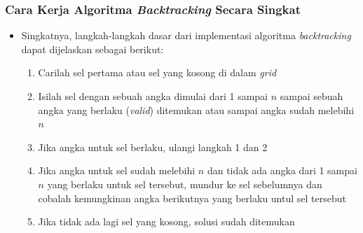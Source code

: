 \documentclass{beamer}
\begin{document}
\begin{frame}
\frametitle{Cara Kerja Algoritma \protect\textit{Backtracking} Secara Singkat}
\begin{itemize}
\item Singkatnya, langkah-langkah dasar dari implementasi algoritma \textit{backtracking} dapat dijelaskan sebagai berikut:
\begin{enumerate}
	\item Carilah sel pertama atau sel yang kosong di dalam \textit{grid}
	\item Isilah sel dengan sebuah angka dimulai dari 1 sampai \begin{math}n\end{math} sampai sebuah angka yang berlaku (\textit{valid}) ditemukan atau sampai angka sudah melebihi \begin{math}n\end{math}
	\item Jika angka untuk sel berlaku, ulangi langkah 1 dan 2
	\item Jika angka untuk sel sudah melebihi \begin{math}n\end{math} dan tidak ada angka dari 1 sampai \begin{math}n\end{math} yang berlaku untuk sel tersebut, mundur ke sel sebelumnya dan cobalah kemungkinan angka berikutnya yang berlaku untul sel tersebut
	\item Jika tidak ada lagi sel yang kosong, solusi sudah ditemukan
	\end{enumerate}
\end{itemize}
\end{frame}

\end{document}
